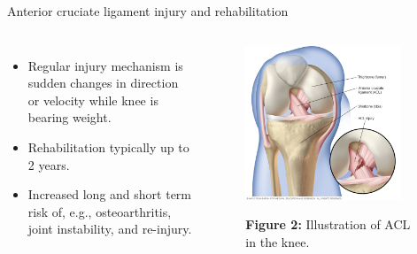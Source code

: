 \begin{frame}[c,fragile]{Anterior cruciate ligament injury and rehabilitation}
  \begin{columns}[c,onlytextwidth]
      \begin{itemize}
          \item Regular injury mechanism is sudden changes in direction or velocity while knee is bearing weight\footnotemark.
          \item Rehabilitation typically up to 2 years\footnotemark.
          \item Increased long and short term risk of, e.g., osteoarthritis\footnotemark, joint instability\footnotemark, and re-injury\footnotemark.
      \end{itemize}

    \begin{figure}
      \centering
      \includegraphics[width=0.9\textwidth]{files/figs/intro/acl.png}

      {\scriptsize\textbf{Figure 2:} Illustration of ACL in the knee\footnotemark.}
    \end{figure}

  \end{columns}


\end{frame}
